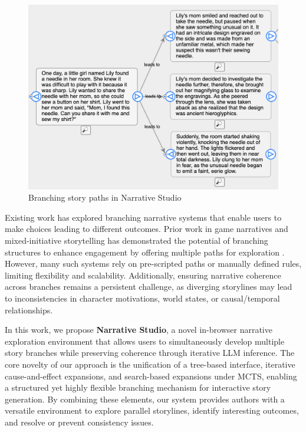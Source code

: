 \documentclass[11pt]{article}
\begin{document}
\begin{figure}
    \centering
    \includegraphics[width=1\linewidth]{figures/events.png}
    \caption{Branching story paths in Narrative Studio}
\end{figure}

Existing work has explored branching narrative systems that enable users to make choices leading to different outcomes. Prior work in game narratives and mixed-initiative storytelling has demonstrated the potential of branching structures to enhance engagement by offering multiple paths for exploration \citep{1626183}. However, many such systems rely on pre-scripted paths or manually defined rules, limiting flexibility and scalability. Additionally, ensuring narrative coherence across branches remains a persistent challenge, as diverging storylines may lead to inconsistencies in character motivations, world states, or causal/temporal relationships.

In this work, we propose \textbf{Narrative Studio}, a novel in-browser narrative exploration environment that allows users to simultaneously develop multiple story branches while preserving coherence through iterative LLM inference. The core novelty of our approach is the unification of a tree-based interface, iterative cause-and-effect expansions, and search-based expansions under MCTS, enabling a structured yet highly flexible branching mechanism for interactive story generation. By combining these elements, our system provides authors with a versatile environment to explore parallel storylines, identify interesting outcomes, and resolve or prevent consistency issues.
\end{document}
